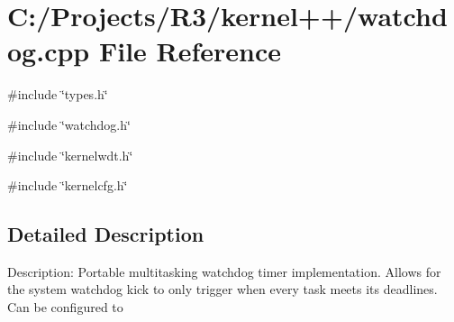 \section{C:/Projects/R3/kernel++/watchdog.cpp File Reference}
\label{watchdog_8cpp}
{\ttfamily \#include \char`\"{}types.h\char`\"{}}\par
{\ttfamily \#include \char`\"{}watchdog.h\char`\"{}}\par
{\ttfamily \#include \char`\"{}kernelwdt.h\char`\"{}}\par
{\ttfamily \#include \char`\"{}kernelcfg.h\char`\"{}}\par


\subsection{Detailed Description}
Description: Portable multitasking watchdog timer implementation. Allows for the system watchdog kick to only trigger when every task meets its deadlines. Can be configured to 